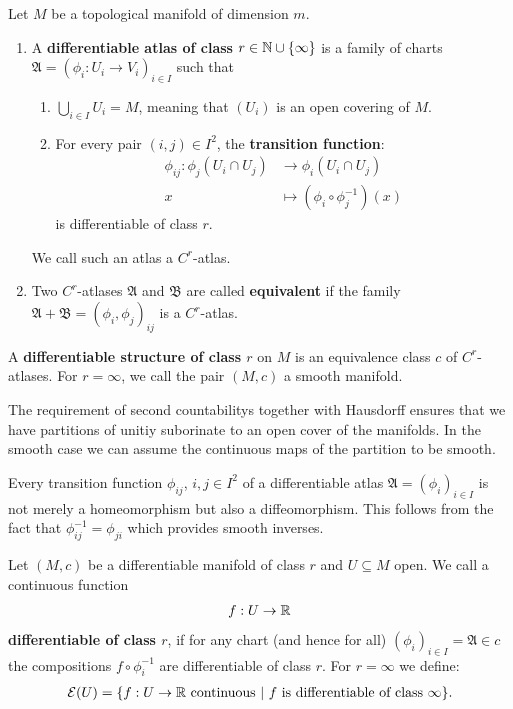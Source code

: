 \begin{definition} \label{def:vb-differentiableManifold}
	Let $M$ be a topological manifold of dimension $m$. 
	\begin{enumerate}
		\item A \textbf{differentiable atlas of class} $r\in \mathbb{N}\cup\{\infty\}$ is a family of charts $\mathfrak{A}=\left( \phi_i:U_i \to V_i\right)_{i\in I}$ such that
		\begin{enumerate}
			\item $\bigcup_{i\in I}U_i=M$, meaning that $\left( U_i\right)$ is an open covering of $M$.
			\item For every pair $(i,j)\in I^2$, the \textbf{transition function}:
			\begin{align*}
				\phi_{ij}:\phi_j(U_i \cap U_j)&\to \phi_i(U_i \cap U_j)\\
				x                             &\mapsto \left(\phi_i \circ \phi_j^{-1}\right)(x)
			\end{align*}
			is differentiable of class $r$.
		\end{enumerate}
		We call such an atlas a $C^r$-atlas.
		\item Two $C^r$-atlases $\mathfrak{A}$ and $\mathfrak{B}$ are called \textbf{equivalent} if the family $\mathfrak{A}+\mathfrak{B}=\left(\phi_i,\phi_j\right)_{ij}$ is a $C^r$-atlas.
	\end{enumerate}
	A \textbf{differentiable structure of class $r$} on $M$ is an equivalence class $c$ of $C^r$-atlases. 
	For $r=\infty$, we call the pair $(M,c)$ a smooth manifold.
\end{definition}
\begin{remark}
	The requirement of second countabilitys together with Hausdorff ensures that we have partitions of unitiy suborinate to an open cover of the manifolds. In the smooth case we can assume the continuous maps of the partition to be smooth. 
\end{remark}

\begin{corollary}
	Every transition function $\phi_{ij}$, $i,j\in I^2$ of a differentiable atlas $\mathfrak{A}=(\phi_i)_{i\in I}$ is not merely a homeomorphism but also a diffeomorphism. This follows from the fact that $\phi_{ij}^{-1}=\phi_{ji}$ which provides smooth inverses.
\end{corollary}

\begin{definition} \label{def:vb-smoothFunctions}
	Let $(M,c)$ be a differentiable manifold of class $r$ and $U\subseteq M$ open. We call a continuous function 
	\begin{align*}
		f:U \to \mathbb{R}
	\end{align*} \textbf{differentiable of class $r$}, if for any chart (and hence for all) $(\phi_i)_{i\in I}=\mathfrak{A}\in c$ the compositions $f\circ \phi_i^{-1}$ are differentiable of class $r$. For $r=\infty$ we define:
	\begin{align*}
		\mathcal{E}(U)=\{f :  U \to \mathbb{R} \text{ continuous}~|~ f \text{ is differentiable of class }\infty \} .
	\end{align*}
\end{definition} 


